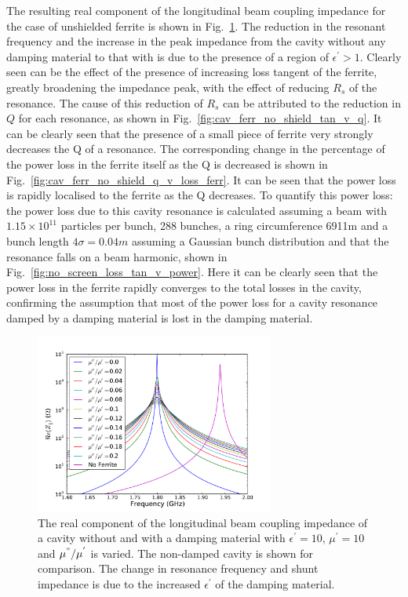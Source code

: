 The resulting real component of the longitudinal beam coupling impedance for the case of unshielded ferrite is shown in Fig.~\ref{fig:no_screen_long_imp}. The reduction in the resonant frequency and the increase in the peak impedance from the cavity without any damping material to that with is due to the presence of a region of $\epsilon^{'}>1$. Clearly seen can be the effect of the presence of increasing loss tangent of the ferrite, greatly broadening the impedance peak, with the effect of reducing $R_{s}$ of the resonance. The cause of this reduction of $R_{s}$ can be attributed to the reduction in $Q$ for each resonance, as shown in Fig.~\ref{fig:cav_ferr_no_shield_tan_v_q}. It can be clearly seen that the presence of a small piece of ferrite very strongly decreases the Q of a resonance. The corresponding change in the percentage of the power loss in the ferrite itself as the Q is decreased is shown in Fig.~\ref{fig:cav_ferr_no_shield_q_v_loss_ferr}. It can be seen that the power loss is rapidly localised to the ferrite as the Q decreases. To quantify this power loss: the power loss due to this cavity resonance is calculated assuming a beam with $1.15 \times 10^{11}$ particles per bunch, 288 bunches, a ring circumference 6911m and a bunch length $4\sigma = 0.04m$ assuming a Gaussian bunch distribution and that the resonance falls on a beam harmonic, shown in Fig.~\ref{fig:no_screen_loss_tan_v_power}. Here it can be clearly seen that the power loss in the ferrite rapidly converges to the total losses in the cavity, confirming the assumption that most of the power loss for a cavity resonance damped by a damping material is lost in the damping material. 

\begin{figure}
\begin{center}
\includegraphics[width=0.7\textwidth]{Beam_Coupling_Impedance_Reduction_Techniques/figures/no_screen_long_imp_all.pdf}
\end{center}
\caption{The real component of the longitudinal beam coupling impedance of a cavity without and with a damping material with $\epsilon^{'}=10$, $\mu^{'}=10$ and $\mu^{"}/\mu^{'}$ is varied. The non-damped cavity is shown for comparison. The change in resonance frequency and shunt impedance is due to the increased $\epsilon^{'}$ of the damping material.}
\label{fig:no_screen_long_imp}
\end{figure}

